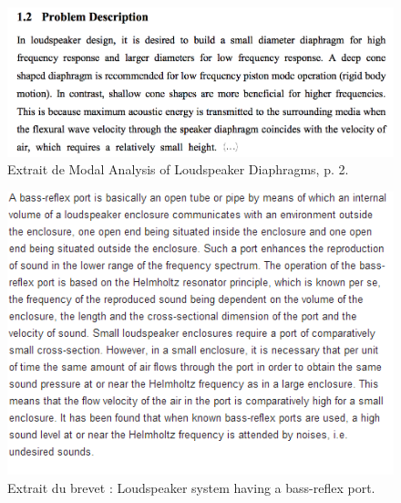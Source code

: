 \begin{figure}[h]
\begin{center}
\includegraphics[scale=0.35]{img/Trace2-Miller.png}
\end{center}
\caption{Extrait de \cite{Miller} Modal Analysis of Loudspeaker Diaphragms, p. 2.} %
\label{Trace 2}
\end{figure}

\begin{figure}[h]
\begin{center}
\includegraphics{img/Trace-3-US6275597.png}
\end{center}
\caption{Extrait du brevet \cite{US6275597} : Loudspeaker system having a bass-reflex port.} %
 \label{Trace 3}
\end{figure}

